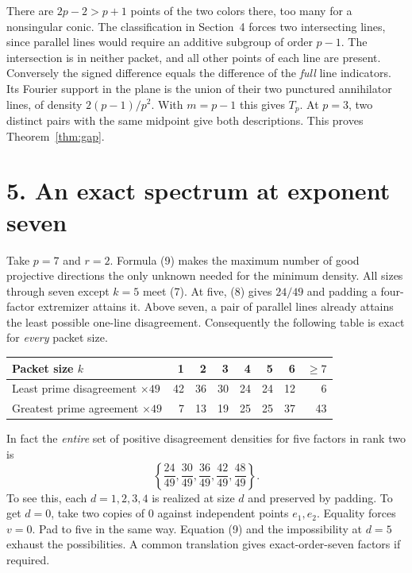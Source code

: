 \documentclass[11pt,letterpaper]{article}
\newcommand{\heading}[1]{\section*{\color{ink}#1}}
\begin{document}
There are $2p-2>p+1$ points of the two colors there, too many for a nonsingular conic. The classification in Section~4 forces two intersecting lines, since parallel lines would require an additive subgroup of order $p-1$. The intersection is in neither packet, and all other points of each line are present. Conversely the signed difference equals the difference of the \emph{full} line indicators. Its Fourier support in the plane is the union of their two punctured annihilator lines, of density $2(p-1)/p^2$. With $m=p-1$ this gives $T_p$. At $p=3$, two distinct pairs with the same midpoint give both descriptions. This proves Theorem~\ref{thm:gap}.

\newpage
\heading{5. An exact spectrum at exponent seven}
Take $p=7$ and $r=2$. Formula (9) makes the maximum number of good projective directions the only unknown needed for the minimum density. All sizes through seven except $k=5$ meet (7). At five, (8) gives $24/49$ and padding a four-factor extremizer attains it. Above seven, a pair of parallel lines already attains the least possible one-line disagreement. Consequently the following table is exact for \emph{every} packet size.
\begin{center}
\begin{tabular}{lrrrrrrr}
\toprule
Packet size $k$ & 1 & 2 & 3 & 4 & 5 & 6 & $\ge7$\\
\midrule
Least prime disagreement $\times 49$ &42&36&30&24&24&12&6\\
Greatest prime agreement $\times 49$ &7&13&19&25&25&37&43\\
\bottomrule
\end{tabular}
\end{center}
In fact the \emph{entire} set of positive disagreement densities for five factors in rank two is
\[
                \left\{\frac{24}{49},\frac{30}{49},\frac{36}{49},
                               \frac{42}{49},\frac{48}{49}\right\}.   \tag{10}
\]
To see this, each $d=1,2,3,4$ is realized at size $d$ and preserved by padding. To get $d=0$, take two copies of $0$ against independent points $e_1,e_2$. Equality forces $v=0$. Pad to five in the same way. Equation (9) and the impossibility at $d=5$ exhaust the possibilities. A common translation gives exact-order-seven factors if required.
\end{document}
